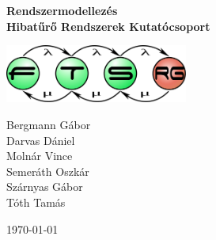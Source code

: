 \begin{titlepage}
\begin{center}
\vspace*{5cm}

{\huge \bfseries Rendszermodellezés}\\[0.8cm]

{\Large \bfseries Hibatűrő Rendszerek Kutatócsoport}\\[0.8cm]

\vspace{1cm}

\includegraphics[width=60mm,keepaspectratio]{figures/ftsrg-logo}\\

\vfill

Bergmann Gábor \\
Darvas Dániel \\
Molnár Vince \\
Semeráth Oszkár \\
Szárnyas Gábor \\
Tóth Tamás

\vfill

{\large \today}

\vspace{3cm}
\end{center}
\end{titlepage}
